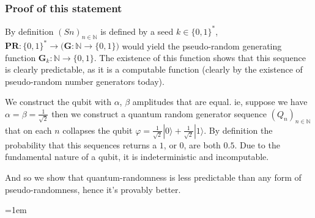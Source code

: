 \documentclass{article}
\begin{document}
\subsubsection*{Proof of this statement}
By definition $(Sn)_{n\in\mathbb{N}}$ is defined by a seed $k \in \{0,1\}^*$, $\bm{PR}: \{0,1\}^* \rightarrow \bigl(\bm{G}: \mathbb{N} \rightarrow \{0,1\}\bigr)$ would yield the pseudo-random generating function $\bm{G}_k: \mathbb{N} \rightarrow \{0,1\}$. The existence of this function shows that this sequence is clearly predictable, as it is a computable function (clearly by the existence of pseudo-random number generators today).

We construct the qubit with $\alpha$, $\beta$ amplitudes that are equal. ie, suppose we have $\alpha = \beta = \frac{1}{\sqrt{2}}$ then we construct a quantum random generator sequence $(Q_n)_{n \in \mathbb{N}}$ that on each $n$ collapses the qubit $\varphi = \frac{1}{\sqrt{2}} | 0\rangle + \frac{1}{\sqrt{2}} | 1\rangle$. By definition the probability that this sequences returns a $1$, or $0$, are both $0.5$. Due to the fundamental nature of a qubit, it is indeterministic and incomputable.

And so we show that quantum-randomness is less predictable than any form of pseudo-randomness, hence it's provably better.

\emergencystretch=1em
\printbibliography
\end{document}
